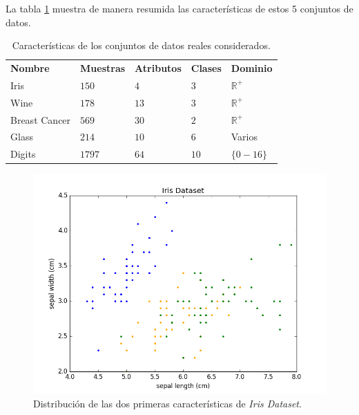 La tabla \ref{tab:tabla7} muestra de manera resumida las características de estos 5 conjuntos de datos.

\begin{table}[h]
	\centering
	\setlength{\arrayrulewidth}{1mm}
	\setlength{\tabcolsep}{10pt}
	\renewcommand{\arraystretch}{0.75}
	
	\begin{tabular}{ >{\centering\arraybackslash}m{2.5cm}  >{\centering\arraybackslash}m{1.5cm}>{\centering\arraybackslash}m{1.5cm}>{\centering\arraybackslash}m{1.5cm}>{\centering\arraybackslash}m{1.5cm}}
		\hline
		\rowcolor{black}
		\multicolumn{5}{c}{\bf \color{white}{Conjuntos de datos reales}}\\
		\hline
		\rowcolor{gray!50}
		\textbf{Nombre} & \textbf{Muestras} & \textbf{Atributos} & \textbf{Clases} & \textbf{Dominio} \\
		Iris & $150$ & $4$ & $3$ & $\mathbb{R}^+$ \\
		Wine & $178$ & $13$ & $3$ & $\mathbb{R}^+$ \\
		Breast Cancer & $569$ & $30$ & $2$ & $\mathbb{R}^+$ \\
		Glass & $214$ & $10$ & $6$ & Varios \\
		Digits & $1797$ & $64$ & $10$ & $\{0-16\}$ \\
		\hline
		
	\end{tabular}
	\caption{Características de los conjuntos de datos reales considerados.}
	\label{tab:tabla7}
\end{table}

\begin{figure}[!h]
	\centering
	\includegraphics[scale=0.32]{imagenes/c6/IrisSet}
	\caption{Distribución de las dos primeras características de \textit{Iris Dataset}.}\label{fig:figure27}
\end{figure}


